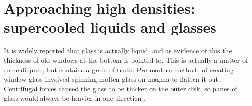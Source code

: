 \section{Approaching high densities: supercooled liquids and glasses}



It is widely reported that glass is actually liquid, and as evidence of this the thickness of old windows at the bottom is pointed to.
This is actually a matter of some dispute, but contains a grain of truth.
Pre-modern methods of creating window glass involved spinning molten glass on magma to flatten it out.
Centrifugal forces caused the glass to be thicker on the outer disk, so panes of glass would always be heavier in one direction%
.

